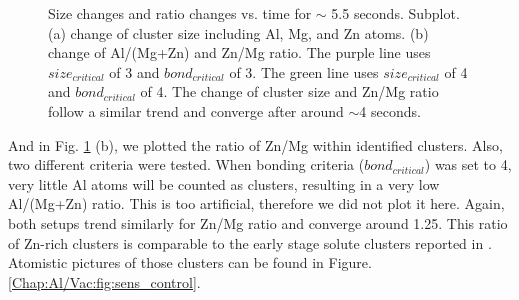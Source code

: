 \newpage
\begingroup
\begin{figure}[!ht]
  \centering
\caption[Size changes and ratio changes vs. time for $\sim$ 5.5 seconds. ]{Size changes and ratio changes vs. time for $\sim$ 5.5 seconds. Subplot. (a) change of cluster size including Al, Mg, and Zn atoms. (b) change of Al/(Mg+Zn) and Zn/Mg ratio. The purple line uses $size_{critical}$ of 3 and $bond_{critical}$ of 3. The green line uses $size_{critical}$ of 4 and $bond_{critical}$ of 4. The change of cluster size and Zn/Mg ratio follow a similar trend and converge after around $\sim$4 seconds.}
\label{Chap:Al/Vac:fig:Al_Mg_Zn_benchmark}
\end{figure}
\endgroup

And in Fig. \ref{Chap:Al/Vac:fig:Al_Mg_Zn_benchmark} (b), we plotted the ratio of Zn/Mg within identified clusters. Also, two different criteria were tested. When bonding criteria ($bond_{critical}$) was set to 4, very little Al atoms will be counted as clusters, resulting in a very low Al/(Mg+Zn) ratio. This is too artificial, therefore we did not plot it here. Again, both setups trend similarly for Zn/Mg ratio and converge around 1.25. This ratio of Zn-rich clusters is comparable to the early stage solute clusters reported in \cite{liu2020formation}. Atomistic pictures of those clusters can be found in Figure. \ref{Chap:Al/Vac:fig:sens_control}.


